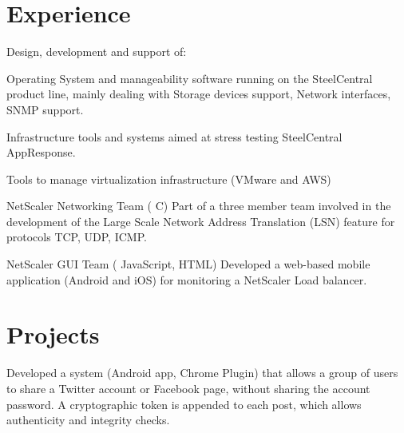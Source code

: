 \documentclass[]{deedy-resume-openfont}
\begin{document}
\hfill
\begin{minipage}[t]{0.63\textwidth} 


\section{Experience}

Design, development and support of:
\vspace{\topsep}
\begin{tightemize}
\item Operating System and manageability software running on the SteelCentral product line,
 mainly dealing with Storage devices support, Network interfaces, SNMP support.
\item Infrastructure tools and systems aimed at stress testing SteelCentral AppResponse. 
\item Tools to manage virtualization infrastructure (VMware and AWS) 
\end{tightemize}
\sectionsep
{}
\sectionsep

\begin{tightemize}
\item NetScaler
Networking
Team
(
C)
Part of a three member team
involved
in
the
development
of
the
Large
Scale
Network
Address
Translation
(LSN)
feature
for
protocols
TCP,
UDP,
ICMP.
\item NetScaler
GUI
Team
(
JavaScript,
HTML)
Developed a
web-based
mobile
application (Android
and
iOS)
for
monitoring
a
NetScaler
Load
balancer.
\end{tightemize}
\sectionsep

\begin{tightemize}
\end{tightemize}
\sectionsep


\section{Projects}
{\fontsize{9}{11}\selectfont
{}
Developed a system (Android app, Chrome Plugin) that
allows
a
group
of
users
to
share
a
Twitter
account
or
Facebook
page,
without
sharing
the
account
password.
A
cryptographic
token
is
appended
to
each
post,
which
allows authenticity and integrity checks.
\sectionsep

}
\end{minipage}
\end{document}
